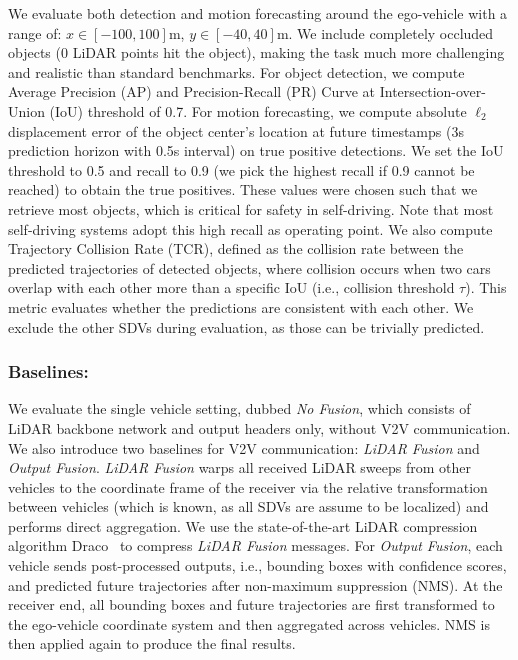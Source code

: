 \documentclass[runningheads]{llncs}
\begin{document}
We evaluate both detection and motion forecasting around the ego-vehicle with a range of: $x \in [-100, 100]$m, $y \in [-40, 40]$m. We include completely occluded objects ($0$ LiDAR points hit the object), making the task much more challenging and realistic than 
standard benchmarks.
For object detection, we compute Average Precision (AP) and Precision-Recall (PR) Curve at Intersection-over-Union (IoU) threshold of 0.7.
For motion forecasting, we compute absolute $\ell_2$ displacement error of the object center's location at future timestamps (3s prediction horizon with 0.5s interval) on true positive detections. We set the IoU threshold to 0.5 and recall to 0.9 (we pick the highest recall if 0.9 cannot be reached) to obtain the true positives. 
These values were chosen such that  we retrieve most objects, which is critical for safety in self-driving.
Note that most self-driving systems adopt this high recall as operating point.
We also compute Trajectory Collision Rate (TCR),  defined as the collision rate between the predicted trajectories of detected objects, where collision occurs when two cars overlap with each other more than a specific IoU (i.e., collision threshold $\tau$). This metric evaluates whether the predictions  are consistent with each other.
We exclude the other SDVs 
during evaluation, as those can be trivially predicted.

\subsubsection{Baselines:}
We evaluate the single vehicle setting, dubbed \textit{No Fusion}, which consists of LiDAR backbone network and output headers only, without V2V communication. We also  introduce two baselines for V2V communication: \textit{LiDAR Fusion} and \textit{Output Fusion}.  \textit{LiDAR Fusion} warps all received LiDAR sweeps from other vehicles to the coordinate frame of the receiver
via the relative transformation between vehicles (which is known, as all SDVs are assume to be localized) and performs direct aggregation.
We use the state-of-the-art LiDAR compression algorithm Draco~\cite{draco} to compress \textit{LiDAR Fusion} messages.
For \textit{Output Fusion}, each vehicle sends post-processed outputs, i.e., bounding boxes with confidence scores, and predicted future trajectories after non-maximum suppression (NMS). At the receiver end, all bounding boxes and future trajectories are first transformed to the ego-vehicle coordinate system and then aggregated across vehicles. NMS is then applied again to produce the final results.
\end{document}
